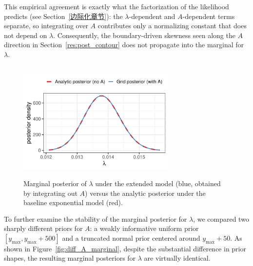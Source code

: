 This empirical agreement is exactly what the factorization of the likelihood predicts (see Section~\ref{边际化章节}): the $\lambda$-dependent and $A$-dependent terms separate, so integrating over $A$ contributes only a normalizing constant that does not depend on $\lambda$. Consequently, the boundary-driven skewness seen along the $A$ direction in Section~\ref{res:post_contour} does not propagate into the marginal for $\lambda$.

\begin{figure}[H]
    \centering
    \includegraphics[height=6cm, width=0.7\textwidth]{images/lambda_marginal_compare.pdf}
    \caption{{\small Marginal posterior of $\lambda$ under the extended model (blue, obtained by integrating out $A$) versus the analytic posterior under the baseline exponential model (red).}}
    \label{fig:marginal}
\end{figure}
To further examine the stability of the marginal posterior for $\lambda$, we compared two sharply different priors for $A$: a weakly informative uniform prior $[y_{\max}, y_{\max}+500]$ and a truncated normal prior centered around $y_{\max}+50$. As shown in Figure~\ref{fig:diff_A_marginal}, despite the substantial difference in prior shapes, the resulting marginal posteriors for $\lambda$ are virtually identical.

